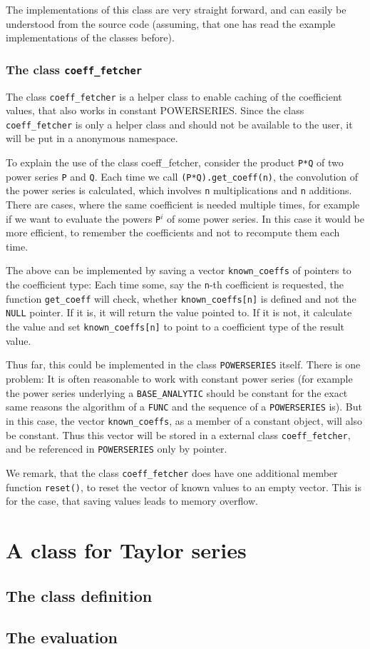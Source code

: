 \documentclass{article}
\newcommand{\code}[1]{\texttt{#1}}
\newcommand{\func}[1]{\texttt{#1}}
\newcommand{\NULL}{\texttt{NULL} pointer\xspace}
\begin{document}
The implementations of this class are very straight forward, and can easily be understood from the source code (assuming, that one has read the example implementations of the classes before).

\subsubsection{The class \code{coeff\_fetcher}}

The class \code{coeff\_fetcher} is a helper class to enable caching of the coefficient values, that also works in constant POWERSERIES. Since the class \code{coeff\_fetcher} is only a helper class and should not be available to the user, it will be put in a anonymous namespace.

To explain the use of the class coeff\_fetcher, consider the product \code{P*Q} of two power series \code{P} and \code{Q}. Each time we call \code{(P*Q).get\_coeff(n)}, the convolution of the power series is calculated, which involves \code{n} multiplications and \code{n} additions. There are cases, where the same coefficient is needed multiple times, for example if we want to evaluate the powers \code{P}$^i$ of some power series. In this case it would be more efficient, to remember the coefficients and not to recompute them each time.

The above can be implemented by saving a vector \code{known\_coeffs} of pointers to the coefficient type: Each time some, say the \code{n}-th coefficient is requested, the function \code{get\_coeff} will check, whether \code{known\_coeffs[n]} is defined and not the \NULL. If it is, it will return the value pointed to. If it is not, it calculate the value and set \code{known\_coeffs[n]} to point to a coefficient type of the result value.

Thus far, this could be implemented in the class \func{POWERSERIES} itself. There is one problem: It is often reasonable to work with constant power series (for example the power series underlying a \func{BASE\_ANALYTIC} should be constant for the exact same reasons the algorithm of a \func{FUNC} and the sequence of a \func{POWERSERIES} is). But in this case, the vector \code{known\_coeffs}, as a member of a constant object, will also be constant. Thus this vector will be stored in a external class \func{coeff\_fetcher}, and be referenced in \func{POWERSERIES} only by pointer.

We remark, that the class \func{coeff\_fetcher} does have one additional member function \code{reset()}, to reset the vector of known values to an empty vector. This is for the case, that saving values leads to memory overflow.

\section{A class for Taylor series}

\subsection{The class definition}
\subsection{The evaluation}
\end{document}
